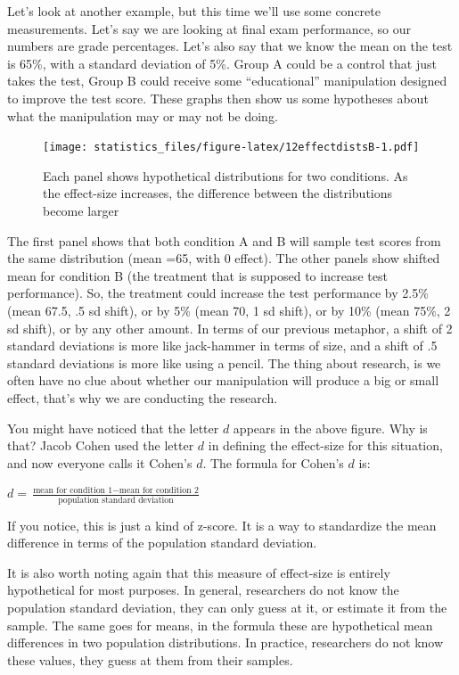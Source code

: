 \documentclass[]{book}
\begin{document}
Let's look at another example, but this time we'll use some concrete measurements. Let's say we are looking at final exam performance, so our numbers are grade percentages. Let's also say that we know the mean on the test is 65\%, with a standard deviation of 5\%. Group A could be a control that just takes the test, Group B could receive some ``educational'' manipulation designed to improve the test score. These graphs then show us some hypotheses about what the manipulation may or may not be doing.

\begin{figure}
\centering
\texttt{[image: statistics\_files/figure-latex/12effectdistsB-1.pdf]}
\caption{\label{fig:12effectdistsB}Each panel shows hypothetical distributions for two conditions. As the effect-size increases, the difference between the distributions become larger}
\end{figure}

The first panel shows that both condition A and B will sample test scores from the same distribution (mean =65, with 0 effect). The other panels show shifted mean for condition B (the treatment that is supposed to increase test performance). So, the treatment could increase the test performance by 2.5\% (mean 67.5, .5 sd shift), or by 5\% (mean 70, 1 sd shift), or by 10\% (mean 75\%, 2 sd shift), or by any other amount. In terms of our previous metaphor, a shift of 2 standard deviations is more like jack-hammer in terms of size, and a shift of .5 standard deviations is more like using a pencil. The thing about research, is we often have no clue about whether our manipulation will produce a big or small effect, that's why we are conducting the research.

You might have noticed that the letter \(d\) appears in the above figure. Why is that? Jacob Cohen \citep{cohen1988} used the letter \(d\) in defining the effect-size for this situation, and now everyone calls it Cohen's \(d\). The formula for Cohen's \(d\) is:

\(d = \frac{\text{mean for condition 1} - \text{mean for condition 2}}{\text{population standard deviation}}\)

If you notice, this is just a kind of z-score. It is a way to standardize the mean difference in terms of the population standard deviation.

It is also worth noting again that this measure of effect-size is entirely hypothetical for most purposes. In general, researchers do not know the population standard deviation, they can only guess at it, or estimate it from the sample. The same goes for means, in the formula these are hypothetical mean differences in two population distributions. In practice, researchers do not know these values, they guess at them from their samples.
\end{document}
